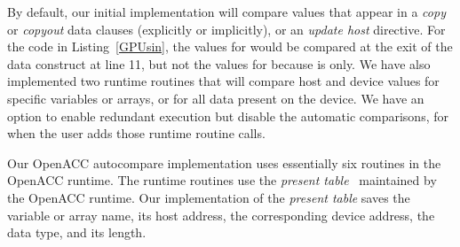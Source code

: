 By default, our initial implementation will compare values that appear in a \emph{copy} or \emph{copyout} data clauses (explicitly or implicitly), or an \emph{update host} directive.
For the code in Listing~\ref{GPUsin}, the values for  would be compared at the exit of the data construct at line 11, but not the values for  because  is  only.
We have also implemented two runtime routines that will compare host and device values for specific variables or arrays, or for all data present on the device.
We have an option to enable redundant execution but disable the automatic comparisons, for when the user adds those runtime routine calls.



Our OpenACC autocompare implementation uses essentially six routines in the OpenACC runtime.
The runtime routines use the \emph{present table}~\cite{wolfe.ashes.17} maintained by the OpenACC runtime.
Our implementation of the \emph{present table} saves the variable or array name, its host address, the corresponding device address, the data type, and its length.
